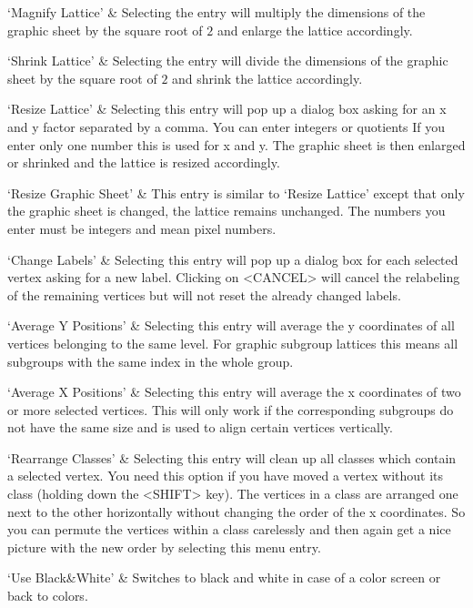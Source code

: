 `Magnify Lattice' & 
  Selecting the entry will multiply the dimensions of the graphic sheet by
  the square root of $2$ and enlarge the lattice accordingly.

`Shrink Lattice' &
  Selecting  the entry will divide the  dimensions  of the graphic sheet by 
  the square root of $2$ and shrink the lattice accordingly.

`Resize Lattice' &
Selecting this entry will pop up a dialog box asking for an x and y factor
separated by a comma.  You can enter integers or quotients If you enter
only one number this is used for x and y.  The graphic sheet is then
enlarged or shrinked and the lattice is resized accordingly.

`Resize Graphic Sheet' &
This  entry is similar to `Resize  Lattice' except that  only the graphic
sheet is changed, the lattice remains unchanged. The numbers you enter must 
be integers and mean pixel numbers.

`Change Labels' &
Selecting  this entry will pop  up a dialog  box for each selected vertex
asking for a new label.  Clicking on <CANCEL>  will cancel the relabeling
of the remaining vertices but will not reset the already changed labels.

`Average Y Positions' &
Selecting this entry will average the y coordinates of all vertices
belonging to the same level. For graphic subgroup lattices this means all
subgroups with the same index in the whole group.

`Average X Positions' &
Selecting this entry  will  average the x   coordinates  of two or   more
selected vertices.  This will only work if the corresponding subgroups do
not have the same size and is used to align certain vertices
vertically.

`Rearrange Classes' &
Selecting this entry will clean up all classes which contain a selected
vertex. You need this option if you have moved a vertex without its class
(holding down the <SHIFT> key). The vertices in a class are arranged one
next to the other horizontally without changing the order of the x
coordinates. So you can permute the vertices within a class carelessly and
then again get a nice picture with the new order by selecting this menu
entry.

`Use Black\&White' &
Switches to black and white in case of a color screen or back to colors.
\enditems


